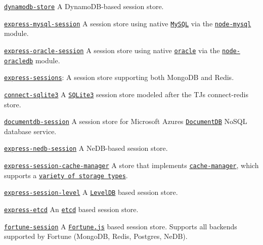 \href{https://www.npmjs.com/package/dynamodb-store}{\tt dynamodb-\/store} A Dynamo\+D\+B-\/based session store.

\href{https://www.npmjs.com/package/express-mysql-session}{\tt express-\/mysql-\/session} A session store using native \href{https://www.mysql.com/}{\tt My\+S\+QL} via the \href{https://github.com/felixge/node-mysql}{\tt node-\/mysql} module.

\href{https://www.npmjs.com/package/express-oracle-session}{\tt express-\/oracle-\/session} A session store using native \href{https://www.oracle.com/}{\tt oracle} via the \href{https://www.npmjs.com/package/oracledb}{\tt node-\/oracledb} module.

\href{https://www.npmjs.com/package/express-sessions}{\tt express-\/sessions}\+: A session store supporting both Mongo\+DB and Redis.

\href{https://www.npmjs.com/package/connect-sqlite3}{\tt connect-\/sqlite3} A \href{https://github.com/mapbox/node-sqlite3}{\tt S\+Q\+Lite3} session store modeled after the TJ\textquotesingle{}s {\ttfamily connect-\/redis} store.

\href{https://www.npmjs.com/package/documentdb-session}{\tt documentdb-\/session} A session store for Microsoft Azure\textquotesingle{}s \href{https://azure.microsoft.com/en-us/services/documentdb/}{\tt Document\+DB} No\+S\+QL database service.

\href{https://www.npmjs.com/package/express-nedb-session}{\tt express-\/nedb-\/session} A Ne\+D\+B-\/based session store.

\href{https://www.npmjs.com/package/express-session-cache-manager}{\tt express-\/session-\/cache-\/manager} A store that implements \href{https://www.npmjs.com/package/cache-manager}{\tt cache-\/manager}, which supports a \href{https://www.npmjs.com/package/cache-manager#store-engines}{\tt variety of storage types}.

\href{https://www.npmjs.com/package/express-session-level}{\tt express-\/session-\/level} A \href{https://github.com/Level/levelup}{\tt Level\+DB} based session store.

\href{https://www.npmjs.com/package/express-etcd}{\tt express-\/etcd} An \href{https://github.com/stianeikeland/node-etcd}{\tt etcd} based session store.

\href{https://www.npmjs.com/package/fortune-session}{\tt fortune-\/session} A \href{https://github.com/fortunejs/fortune}{\tt Fortune.\+js} based session store. Supports all backends supported by Fortune (Mongo\+DB, Redis, Postgres, Ne\+DB).

